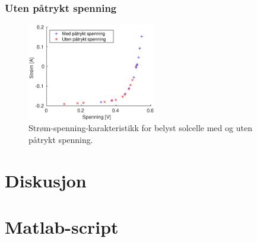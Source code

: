 \documentclass[a4paper,11pt, twocolumn]{article}
\begin{document}
\subsubsection{Uten påtrykt spenning}
\begin{figure}[!ht]
	\includegraphics[width = 0.5\textwidth]{matlab/LAB/utenSpenning.eps}
	\caption{Strøm-spenning-karakteristikk for belyst solcelle med og uten påtrykt spenning.}
	\label{fig:resMedSpenning}
\end{figure}
\section{Diskusjon}

\clearpage
\onecolumn
\appendix


\section{Matlab-script}
\end{document}
